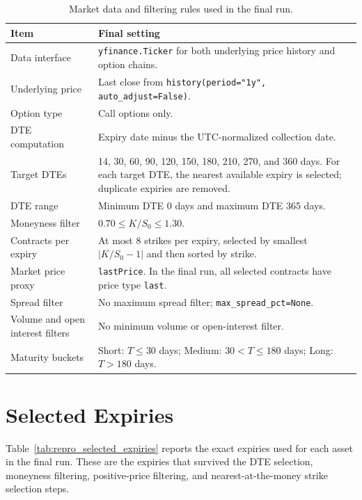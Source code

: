 \documentclass[11pt,a4paper]{report}
\begin{document}
{\small
\begin{longtable}{p{}p{}}
\caption{Market data and filtering rules used in the final run.}
\label{tab:repro_market_rules}\\
\toprule
Item & Final setting \\
\midrule
Data interface & \texttt{yfinance.Ticker} for both underlying price history and option chains. \\
Underlying price & Last close from \texttt{history(period="1y", auto\_adjust=False)}. \\
Option type & Call options only. \\
DTE computation & Expiry date minus the UTC-normalized collection date. \\
Target DTEs & 14, 30, 60, 90, 120, 150, 180, 210, 270, and 360 days. For each target DTE, the nearest available expiry is selected; duplicate expiries are removed. \\
DTE range & Minimum DTE 0 days and maximum DTE 365 days. \\
Moneyness filter & $0.70 \leq K/S_0 \leq 1.30$. \\
Contracts per expiry & At most 8 strikes per expiry, selected by smallest $|K/S_0-1|$ and then sorted by strike. \\
Market price proxy & \texttt{lastPrice}. In the final run, all selected contracts have price type \texttt{last}. \\
Spread filter & No maximum spread filter; \texttt{max\_spread\_pct=None}. \\
Volume and open interest filters & No minimum volume or open-interest filter. \\
Maturity buckets & Short: $T\leq 30$ days; Medium: $30<T\leq 180$ days; Long: $T>180$ days. \\
\bottomrule
\end{longtable}
}

\section{Selected Expiries}

Table~\ref{tab:repro_selected_expiries} reports the exact expiries used for each asset in the final run. These are the expiries that survived the DTE selection, moneyness filtering, positive-price filtering, and nearest-at-the-money strike selection steps.
\end{document}
